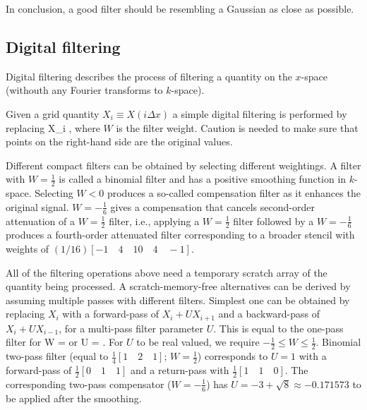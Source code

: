 \documentclass{aa}
\begin{document}
In conclusion, a good filter should be resembling a Gaussian as close as possible.

\subsection{Digital filtering}

Digital filtering describes the process of filtering a quantity on the $x$-space (withouth any Fourier transforms to $k$-space).
\citep{birdsall1985}

Given a grid quantity $X_i \equiv X(i \Delta x)$ a simple digital filtering is performed by replacing
\be
X_i \leftarrow {},
\ee
where $W$ is the filter weight.
Caution is needed to make sure that points on the right-hand side are the original values.

Different compact filters can be obtained by selecting different weightings.
A filter with $W=\frac{1}{2}$ is called a binomial filter and has a positive smoothing function in $k$-space.
Selecting $W < 0$ produces a so-called compensation filter as it enhances the original signal.
$W = -\frac{1}{6}$ gives a compensation that cancels second-order attenuation of a $W=\frac{1}{2}$ filter, i.e., applying a $W=\frac{1}{2}$ filter followed by a $W=-\frac{1}{6}$ produces a fourth-order attenuated filter corresponding to a broader stencil with weights of $(1/16)[-1\quad 4\quad 10\quad 4\quad -1]$.

All of the filtering operations above need a temporary scratch array of the quantity being processed.
A scratch-memory-free alternatives can be derived by assuming multiple passes with different filters.
Simplest one can be obtained by replacing $X_i$ with a forward-pass of $X_i + U X_{i+1}$ and a backward-pass of $X_i + U X_{i-1}$, for a multi-pass filter parameter $U$.
This is equal to the one-pass filter for
\be
W = 
\ee
or
\be
U =  \pm {}.
\ee
For $U$ to be real valued, we require $-\frac{1}{2} \leq W \leq \frac{1}{2}$.
Binomial two-pass filter (equal to $\frac{1}{4}[1\quad 2\quad 1]$; $W=\frac{1}{2}$) corresponds to $U=1$ with a forward-pass of $\frac{1}{2}[0\quad1\quad1]$ and a return-pass with $\frac{1}{2}[1\quad1\quad0]$.
The corresponding two-pass compensator ($W=-\frac{1}{6}$) has $U=-3+\sqrt{8} \approx -0.171573$ to be applied after the smoothing.
\end{document}
